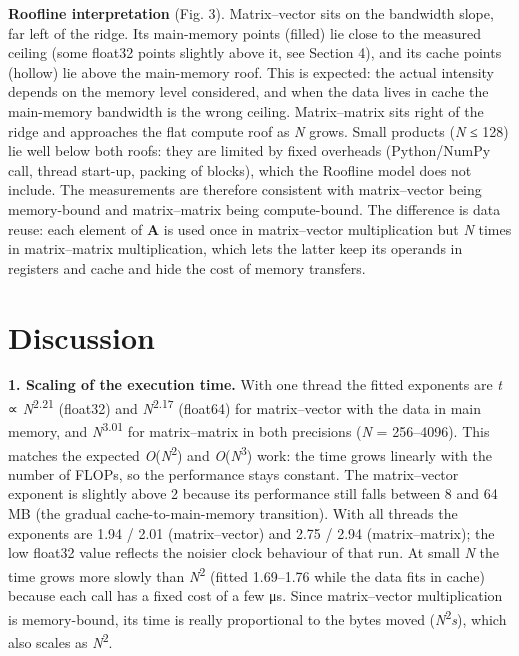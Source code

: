 \documentclass[10pt,a4paper]{article}
\begin{document}
\textbf{Roofline interpretation} (Fig. 3). Matrix–vector sits on the bandwidth slope, far left of the ridge. Its main-memory points (filled) lie close to the measured ceiling (some float32 points slightly above it, see Section 4), and its cache points (hollow) lie above the main-memory roof. This is expected: the actual intensity depends on the memory level considered, and when the data lives in cache the main-memory bandwidth is the wrong ceiling. Matrix–matrix sits right of the ridge and approaches the flat compute roof as \emph{N} grows. Small products (\emph{N} ≤ 128) lie well below both roofs: they are limited by fixed overheads (Python/NumPy call, thread start-up, packing of blocks), which the Roofline model does not include. The measurements are therefore consistent with matrix–vector being memory-bound and matrix–matrix being compute-bound. The difference is data reuse: each element of \textbf{A} is used once in matrix–vector multiplication but \emph{N} times in matrix–matrix multiplication, which lets the latter keep its operands in registers and cache and hide the cost of memory transfers.

\section{Discussion}
\textbf{1. Scaling of the execution time.} With one thread the fitted exponents are \emph{t} ∝ \emph{N}\textsuperscript{2.21} (float32) and \emph{N}\textsuperscript{2.17} (float64) for matrix–vector with the data in main memory, and \emph{N}\textsuperscript{3.01} for matrix–matrix in both precisions (\emph{N} = 256–4096). This matches the expected \emph{O}(\emph{N}\textsuperscript{2}) and \emph{O}(\emph{N}\textsuperscript{3}) work: the time grows linearly with the number of FLOPs, so the performance stays constant. The matrix–vector exponent is slightly above 2 because its performance still falls between 8 and 64 MB (the gradual cache-to-main-memory transition). With all threads the exponents are 1.94 / 2.01 (matrix–vector) and 2.75 / 2.94 (matrix–matrix); the low float32 value reflects the noisier clock behaviour of that run. At small \emph{N} the time grows more slowly than \emph{N}\textsuperscript{2} (fitted 1.69–1.76 while the data fits in cache) because each call has a fixed cost of a few μs. Since matrix–vector multiplication is memory-bound, its time is really proportional to the bytes moved (\emph{N}\textsuperscript{2}\emph{s}), which also scales as \emph{N}\textsuperscript{2}.
\end{document}
